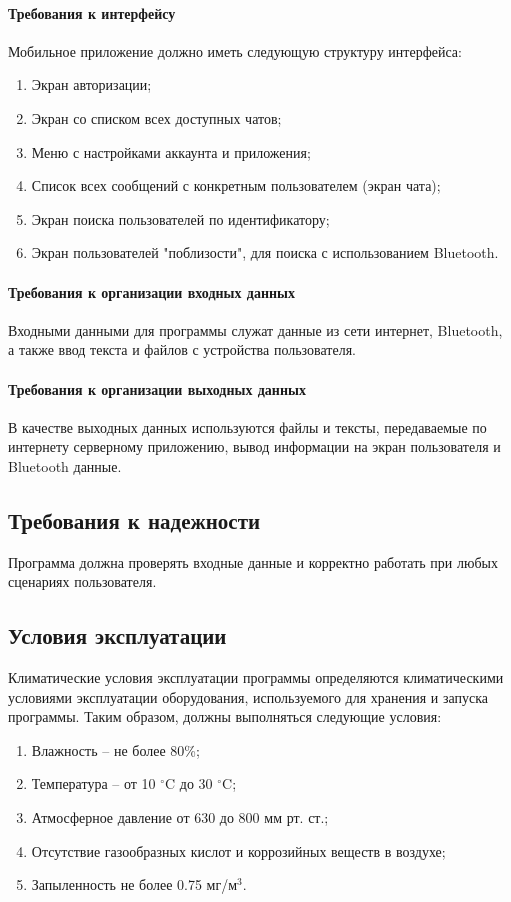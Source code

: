 \documentclass[techtask]{espd}
\begin{document}
\paragraph{Требования к интерфейсу}

Мобильное приложение должно иметь следующую структуру интерфейса:

\begin{enumerate}
\item Экран авторизации;
\item Экран со списком всех доступных чатов;
\item Меню с настройками аккаунта и приложения;
\item Список всех сообщений с конкретным пользователем (экран чата);
\item Экран поиска пользователей по идентификатору;
\item Экран пользователей "поблизости", для поиска с использованием Bluetooth.
\end{enumerate}

\paragraph{Требования к организации входных данных}
Входными данными для программы служат данные из сети интернет, Bluetooth, а также ввод текста и файлов с устройства пользователя.

\paragraph{Требования к организации выходных данных}
В качестве выходных данных используются файлы и тексты, передаваемые по интернету серверному приложению, вывод информации на экран пользователя и Bluetooth данные.

\subsection{Требования к надежности}
Программа должна проверять входные данные и корректно работать при любых сценариях пользователя.
\subsection{Условия эксплуатации}
Климатические условия эксплуатации программы определяются климатическими условиями эксплуатации оборудования, используемого для хранения и запуска программы. Таким образом, должны выполняться следующие условия:

\begin{enumerate}
\item Влажность -- не более 80\%;
\item Температура -- от 10 $^\circ$C до 30 $^\circ$C;
\item Атмосферное давление от 630 до 800 мм рт. ст.;
\item Отсутствие газообразных кислот и коррозийных веществ в воздухе;
\item Запыленность не более 0.75 мг/м$^3$.
\end{enumerate}
\end{document}
